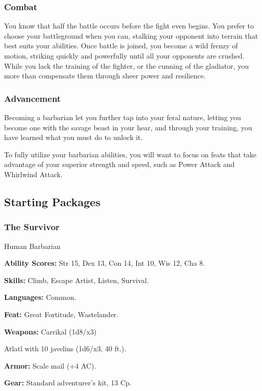\subsubsection{Combat}

You know that half the battle occurs before the fight even begins. You prefer to choose your battleground when you can, stalking your opponent into terrain that best suits your abilities. Once battle is joined, you become a wild frenzy of motion, striking quickly and powerfully until all your opponents are crushed. While you lack the training of the fighter, or the cunning of the gladiator, you more than compensate them through sheer power and resilience.

\subsubsection{Advancement}

Becoming a barbarian let you further tap into your feral nature, letting you become one with the savage beast in your hear, and through your training, you have learned what you must do to unlock it.

To fully utilize your barbarian abilities, you will want to focus on feats that take advantage of your superior strength and speed, such as Power Attack and Whirlwind Attack.

\subsection{Starting Packages}

\subsubsection{The Survivor}

Human Barbarian

\textbf{Ability Scores:} Str 15, Dex 13, Con 14, Int 10, Wis 12, Cha 8.

\textbf{Skills:} Climb, Escape Artist, Listen, Survival.

\textbf{Languages:} Common.

\textbf{Feat:} Great Fortitude, Wastelander.

\textbf{Weapons:} Carrikal (1d8/x3)

Atlatl with 10 javelins (1d6/x3, 40 ft.).

\textbf{Armor:} Scale mail (+4 AC).

\textbf{Gear:} Standard adventurer's kit, 13 Cp.

